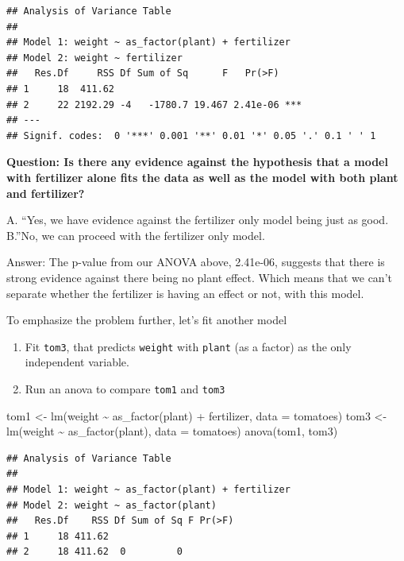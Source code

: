 \documentclass[
  openany]{book}
\newenvironment{Shaded}{\begin{snugshade}}{\end{snugshade}}
\newcommand{\AttributeTok}[1]{\textcolor[rgb]{0.77,0.63,0.00}{#1}}
\newcommand{\FunctionTok}[1]{\textcolor[rgb]{0.00,0.00,0.00}{#1}}
\newcommand{\NormalTok}[1]{#1}
\newcommand{\OtherTok}[1]{\textcolor[rgb]{0.56,0.35,0.01}{#1}}
\newcommand{\SpecialCharTok}[1]{\textcolor[rgb]{0.00,0.00,0.00}{#1}}
\providecommand{\tightlist}{%
  \setlength{\itemsep}{0pt}\setlength{\parskip}{0pt}}
\begin{document}
\begin{verbatim}
## Analysis of Variance Table
## 
## Model 1: weight ~ as_factor(plant) + fertilizer
## Model 2: weight ~ fertilizer
##   Res.Df     RSS Df Sum of Sq      F   Pr(>F)    
## 1     18  411.62                                 
## 2     22 2192.29 -4   -1780.7 19.467 2.41e-06 ***
## ---
## Signif. codes:  0 '***' 0.001 '**' 0.01 '*' 0.05 '.' 0.1 ' ' 1
\end{verbatim}

\textbf{Question: Is there any evidence against the hypothesis that a model with fertilizer alone fits the data as well as the model with both plant and fertilizer?}

A. ``Yes, we have evidence against the fertilizer only model being just as good.\\
B.''No, we can proceed with the fertilizer only model.

Answer: The p-value from our ANOVA above, 2.41e-06, suggests that there is strong evidence against there being no plant effect. Which means that we can't separate whether the fertilizer is having an effect or not, with this model.

To emphasize the problem further, let's fit another model

\begin{enumerate}
\def\labelenumi{\arabic{enumi}.}
\tightlist
\item
  Fit \texttt{tom3}, that predicts \texttt{weight} with \texttt{plant} (as a factor) as the only independent variable.
\item
  Run an anova to compare \texttt{tom1} and \texttt{tom3}
\end{enumerate}

\begin{Shaded}
\begin{Highlighting}[]
\NormalTok{tom1 }\OtherTok{\textless{}{-}} \FunctionTok{lm}\NormalTok{(weight }\SpecialCharTok{\textasciitilde{}} \FunctionTok{as\_factor}\NormalTok{(plant) }\SpecialCharTok{+}\NormalTok{ fertilizer, }\AttributeTok{data =}\NormalTok{ tomatoes)}
\NormalTok{tom3 }\OtherTok{\textless{}{-}} \FunctionTok{lm}\NormalTok{(weight }\SpecialCharTok{\textasciitilde{}} \FunctionTok{as\_factor}\NormalTok{(plant), }\AttributeTok{data =}\NormalTok{ tomatoes)}
\FunctionTok{anova}\NormalTok{(tom1, tom3)}
\end{Highlighting}
\end{Shaded}

\begin{verbatim}
## Analysis of Variance Table
## 
## Model 1: weight ~ as_factor(plant) + fertilizer
## Model 2: weight ~ as_factor(plant)
##   Res.Df    RSS Df Sum of Sq F Pr(>F)
## 1     18 411.62                      
## 2     18 411.62  0         0
\end{verbatim}
\end{document}

